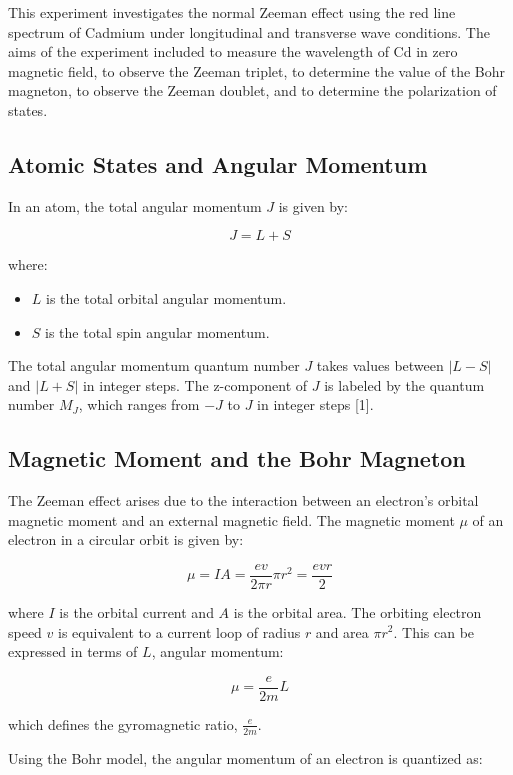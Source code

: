 \documentclass[11pt,twocolumn, a4paper]{article}
\numberwithin{equation}{section} %
\numberwithin{figure}{section} %
\numberwithin{table}{section} %
\begin{document}
This experiment investigates the normal Zeeman effect using the red line spectrum of Cadmium under longitudinal and transverse wave conditions. The aims of the experiment included to measure the wavelength of Cd in zero magnetic field, to observe the Zeeman triplet, to determine the value of the Bohr magneton, to observe the Zeeman doublet, and to determine the polarization of states. 

\subsection{Atomic States and Angular Momentum}

In an atom, the total angular momentum \( J \) is given by:

\[
J = L + S
\]

where:

\begin{itemize}
    \item \( L \) is the total orbital angular momentum.
    \item \( S \) is the total spin angular momentum.
\end{itemize}

The total angular momentum quantum number \( J \) takes values between \( |L - S| \) and \( |L + S| \) in integer steps. The z-component of \( J \) is labeled by the quantum number \( M_J \), which ranges from \( -J \) to \( J \) in integer steps [1].


\subsection{Magnetic Moment and the Bohr Magneton}

The Zeeman effect arises due to the interaction between an electron’s orbital magnetic moment and an external magnetic field. The magnetic moment $\mu$ of an electron in a circular orbit is given by:

\[
\mu = IA = \frac{ev}{2\pi r}\pi r^2 = \frac{evr}{2}
\]

where $I$ is the orbital current and $A$ is the orbital area. The orbiting electron speed \(v\) is equivalent to a current loop of radius \(r\) and area \(\pi r^2\).  This can be expressed in terms of \(L\), angular momentum: 

\[
\mu = \frac{e}{2m} L
\]

which defines the gyromagnetic ratio, $\frac{e}{2m}$.

Using the Bohr model, the angular momentum of an electron is quantized as:
\end{document}
